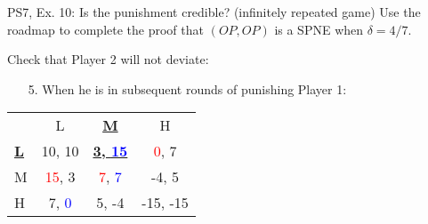 \begin{frame}{PS7, Ex. 10: Is the punishment credible? (infinitely repeated game)}
  Use the roadmap to complete the proof that $(OP,OP)$ is a SPNE when $\delta=4/7$.\vspace{-4pt}
  \begin{multicols}{2}
    Check that Player 2 will not deviate:
    \begin{itemize}
      \item[5.] When he is in subsequent rounds of punishing Player 1:
    \end{itemize}
    \vfill\null\columnbreak
    \vspace{-6pt}
    \begin{table}
      \begin{tabular}{l|c|c|c|}
        \multicolumn{1}{c}{} & \multicolumn{1}{c}{L} & \multicolumn{1}{c}{\textbf{\underline{M}}} & \multicolumn{1}{c}{H} \\\cline{2-4}
        \textbf{\underline{L}} & 10, 10 & \textbf{\underline{3, \textcolor{blue}{15}}} & \textcolor{red}{0}, 7 \\\cline{2-4}
        M & \textcolor{red}{15}, 3 & \textcolor{red}{7}, \textcolor{blue}{7} & -4, 5 \\\cline{2-4}
        H & 7, \textcolor{blue}{0} & 5, -4 & -15, -15 \\\cline{2-4}
      \end{tabular}
    \end{table}
    \vfill\null
  \end{multicols}
    \vfill\null
\end{frame}

